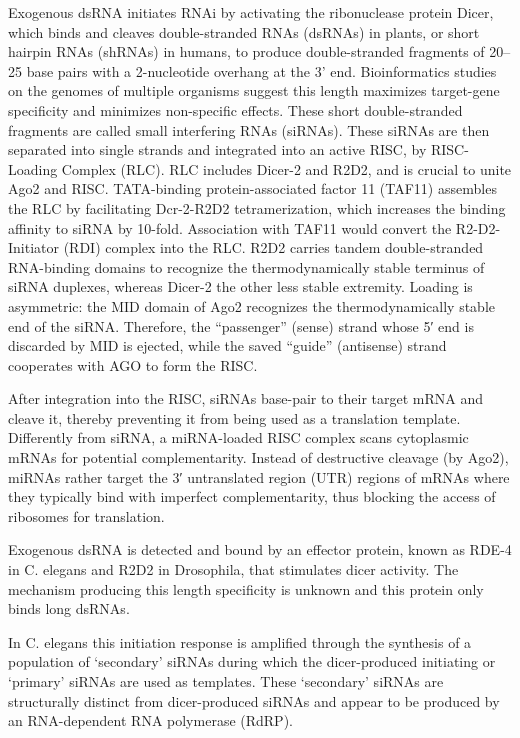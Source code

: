 Exogenous dsRNA initiates RNAi by activating the ribonuclease protein Dicer, which binds and cleaves double-stranded RNAs (dsRNAs) in plants, or short hairpin RNAs (shRNAs) in humans, to produce double-stranded fragments of 20--25 base pairs with a 2-nucleotide overhang at the 3' end. Bioinformatics studies on the genomes of multiple organisms suggest this length maximizes target-gene specificity and minimizes non-specific effects. These short double-stranded fragments are called small interfering RNAs (siRNAs). These siRNAs are then separated into single strands and integrated into an active RISC, by RISC-Loading Complex (RLC). RLC includes Dicer-2 and R2D2, and is crucial to unite Ago2 and RISC. TATA-binding protein-associated factor 11 (TAF11) assembles the RLC by facilitating Dcr-2-R2D2 tetramerization, which increases the binding affinity to siRNA by 10-fold. Association with TAF11 would convert the R2-D2-Initiator (RDI) complex into the RLC. R2D2 carries tandem double-stranded RNA-binding domains to recognize the thermodynamically stable terminus of siRNA duplexes, whereas Dicer-2 the other less stable extremity. Loading is asymmetric: the MID domain of Ago2 recognizes the thermodynamically stable end of the siRNA. Therefore, the ``passenger'' (sense) strand whose 5′ end is discarded by MID is ejected, while the saved ``guide'' (antisense) strand cooperates with AGO to form the RISC.

After integration into the RISC, siRNAs base-pair to their target mRNA and cleave it, thereby preventing it from being used as a translation template. Differently from siRNA, a miRNA-loaded RISC complex scans cytoplasmic mRNAs for potential complementarity. Instead of destructive cleavage (by Ago2), miRNAs rather target the 3′ untranslated region (UTR) regions of mRNAs where they typically bind with imperfect complementarity, thus blocking the access of ribosomes for translation.

Exogenous dsRNA is detected and bound by an effector protein, known as RDE-4 in C. elegans and R2D2 in Drosophila, that stimulates dicer activity. The mechanism producing this length specificity is unknown and this protein only binds long dsRNAs.

In C. elegans this initiation response is amplified through the synthesis of a population of `secondary' siRNAs during which the dicer-produced initiating or `primary' siRNAs are used as templates. These `secondary' siRNAs are structurally distinct from dicer-produced siRNAs and appear to be produced by an RNA-dependent RNA polymerase (RdRP).

